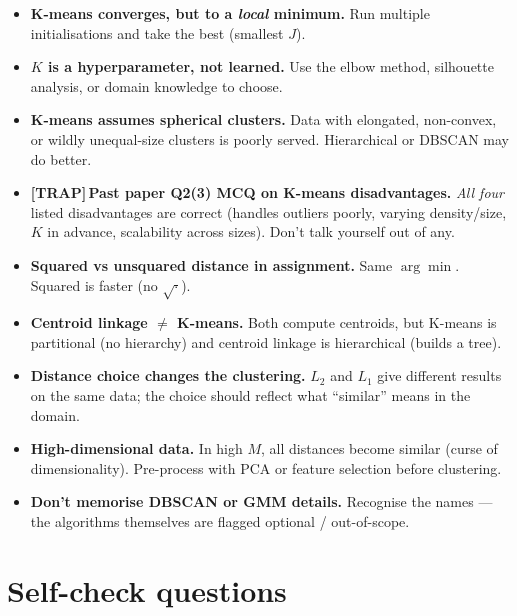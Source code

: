 \documentclass[11pt, a4paper]{article}
\newcommand{\trapflag}{\textcolor{trapBd}{\textbf{[TRAP]}}\,}
\begin{document}
\begin{itemize}
  \item \textbf{K-means converges, but to a \emph{local} minimum.} Run multiple initialisations and take the best (smallest $J$).
  \item \textbf{$K$ is a hyperparameter, not learned.} Use the elbow method, silhouette analysis, or domain knowledge to choose.
  \item \textbf{K-means assumes spherical clusters.} Data with elongated, non-convex, or wildly unequal-size clusters is poorly served. Hierarchical or DBSCAN may do better.
  \item \trapflag{}\textbf{Past paper Q2(3) MCQ on K-means disadvantages.} \emph{All four} listed disadvantages are correct (handles outliers poorly, varying density/size, $K$ in advance, scalability across sizes). Don't talk yourself out of any.
  \item \textbf{Squared vs unsquared distance in assignment.} Same $\arg\min$. Squared is faster (no $\sqrt{\cdot}$).
  \item \textbf{Centroid linkage $\ne$ K-means.} Both compute centroids, but K-means is partitional (no hierarchy) and centroid linkage is hierarchical (builds a tree).
  \item \textbf{Distance choice changes the clustering.} $L_2$ and $L_1$ give different results on the same data; the choice should reflect what ``similar'' means in the domain.
  \item \textbf{High-dimensional data.} In high $M$, all distances become similar (curse of dimensionality). Pre-process with PCA or feature selection before clustering.
  \item \textbf{Don't memorise DBSCAN or GMM details.} Recognise the names — the algorithms themselves are flagged optional / out-of-scope.
\end{itemize}

\section*{Self-check questions}
\end{document}
